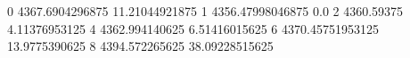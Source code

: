 0 4367.6904296875 11.21044921875
1 4356.47998046875 0.0
2 4360.59375 4.11376953125
4 4362.994140625 6.51416015625
6 4370.45751953125 13.9775390625
8 4394.572265625 38.09228515625
